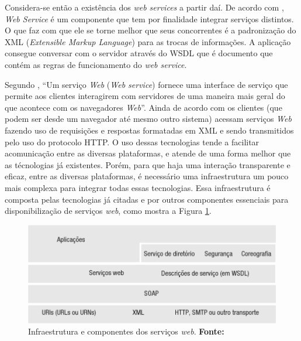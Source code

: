 	\par Considera-se então a existência dos \textit{web services} a partir daí. De
acordo com , \textit{Web Service} é um componente que
tem por finalidade integrar serviços distintos. O que faz com que ele se torne
melhor que seus concorrentes é a padronização do XML (\textit{Extensible Markup
Language}) para as trocas de informações. A aplicação consegue conversar com o
servidor através do  WSDL que é documento que contém as regras de
funcionamento do \textit{web service}.
	
	\par Segundo , “Um serviço \textit{Web} (\textit{Web
service}) fornece uma interface de serviço que permite aos clientes interagirem
com servidores de uma maneira mais geral do que acontece com os navegadores
\textit{Web}”. Ainda de acordo com  os clientes (que
podem ser desde um navegador até mesmo outro sistema) acessam serviços 
\textit{Web} fazendo uso de requisições e respostas formatadas em XML e sendo
transmitidos pelo uso do protocolo HTTP. O uso dessas tecnologias tende a
facilitar acomunicação entre as diversas plataformas, e atende de uma forma
melhor que as técnologias já existentes. Porém, para que haja uma interação
transparente e eficaz, entre as diversas plataformas, é necessário uma
infraestrutura um pouco mais complexa para integrar todas essas tecnologias.
Essa infraestrutura é composta pelas tecnologias já citadas e por outros
componentes essenciais para disponibilização de serviços \textit{web}, como
mostra a Figura \ref{fig:qt2}.

\begin{figure}[h!]
	\centerline{\includegraphics[scale=0.6]{./imagens/1_q_teorico/qt2.png}}
	\caption[Infraestrutura e componentes dos serviços
		\textit{web}. ]{Infraestrutura e componentes dos serviços
		\textit{web}. \textbf{Fonte:}}
	\label{fig:qt2}
\end{figure}
	
